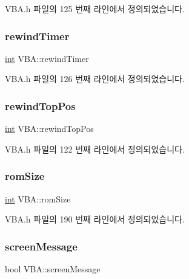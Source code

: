 V\+B\+A.\+h 파일의 125 번째 라인에서 정의되었습니다.

\mbox{\label{class_v_b_a_a682a6a9633f41038b23a2bdcdbde844e}} 
\subsubsection{\texorpdfstring{rewind\+Timer}{rewindTimer}}
{\footnotesize\ttfamily \mbox{\hyperlink{_util_8cpp_a0ef32aa8672df19503a49fab2d0c8071}{int}} V\+B\+A\+::rewind\+Timer}



V\+B\+A.\+h 파일의 126 번째 라인에서 정의되었습니다.

\mbox{\label{class_v_b_a_aa83e33c3d4bb203a5d223a0906a977d8}} 
\subsubsection{\texorpdfstring{rewind\+Top\+Pos}{rewindTopPos}}
{\footnotesize\ttfamily \mbox{\hyperlink{_util_8cpp_a0ef32aa8672df19503a49fab2d0c8071}{int}} V\+B\+A\+::rewind\+Top\+Pos}



V\+B\+A.\+h 파일의 122 번째 라인에서 정의되었습니다.

\mbox{\label{class_v_b_a_ab7d47241ad4bc8c0e6717770797e6d57}} 
\subsubsection{\texorpdfstring{rom\+Size}{romSize}}
{\footnotesize\ttfamily \mbox{\hyperlink{_util_8cpp_a0ef32aa8672df19503a49fab2d0c8071}{int}} V\+B\+A\+::rom\+Size}



V\+B\+A.\+h 파일의 190 번째 라인에서 정의되었습니다.

\mbox{\label{class_v_b_a_a204d14d33aebd442db9affee1cc4f3a8}} 
\subsubsection{\texorpdfstring{screen\+Message}{screenMessage}}
{\footnotesize\ttfamily bool V\+B\+A\+::screen\+Message}



